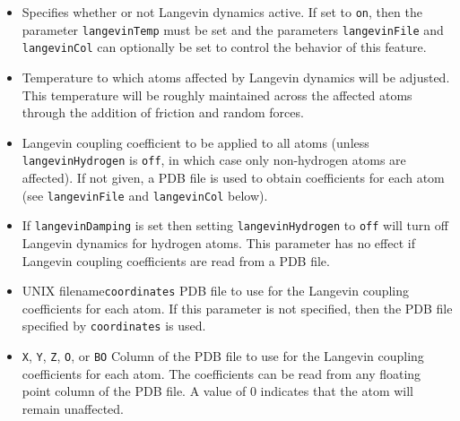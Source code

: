 \begin{itemize}

\item
{}
{Specifies whether or not Langevin dynamics active.  
If set to {\tt on}, then the parameter {\tt langevinTemp} must be set 
and the parameters {\tt langevinFile} and {\tt langevinCol} can
optionally be set to control the behavior of this feature.} 

\item
{}
{Temperature to which atoms affected by Langevin dynamics will be adjusted.  
This temperature will be roughly maintained across the affected atoms 
through the addition of friction and random forces.}

\item
{}
{Langevin coupling coefficient to be applied to all atoms (unless {\tt langevinHydrogen} is {\tt off}, in which case only non-hydrogen atoms are affected).
If not given, a PDB file is used to obtain coefficients for each atom (see {\tt langevinFile} and {\tt langevinCol} below).}

\item
{}
{If {\tt langevinDamping} is set then setting {\tt langevinHydrogen} to {\tt off} will turn off Langevin dynamics for hydrogen atoms.  This parameter has no effect if Langevin coupling coefficients are read from a PDB file.}

\item
{}
{UNIX filename}{{\tt coordinates}}
{PDB file to use for the Langevin coupling coefficients for each atom.  
If this parameter is not specified, then 
the PDB file specified by {\tt coordinates} is used.}

\item
{}
{{\tt X}, {\tt Y}, {\tt Z}, {\tt O}, or {\tt B}}{{\tt O}} 
{Column of the PDB file to use for the Langevin coupling coefficients for 
each atom.  The coefficients can be read from any 
floating point column of the PDB file.  
A value of 0 indicates that the atom will remain unaffected.}

\end{itemize}

